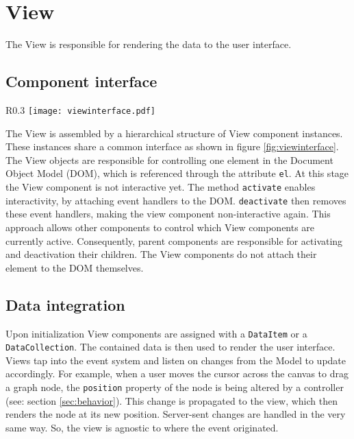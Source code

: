 \section{View}

The View is responsible for rendering the data to the user interface. 

\subsection{Component interface}

\begin{wrapfigure}{R}{0.3\textwidth}
\texttt{[image: viewinterface.pdf]}
\caption{Class diagram of the View component interface}
\label{fig:viewinterface}
\end{wrapfigure}

The View is assembled by a hierarchical structure of View component instances. These instances share a common interface as shown in figure \ref{fig:viewinterface}. The View objects are responsible for controlling one element in the Document Object Model (DOM), which is referenced through the attribute \texttt{el}. At this stage the View component is not interactive yet. The method \texttt{activate} enables interactivity, by attaching event handlers to the DOM. \texttt{deactivate} then removes these event handlers, making the view component non-interactive again. This approach allows other components to control which View components are currently active. Consequently, parent components are responsible for activating and deactivation their children. The View components do not attach their element to the DOM themselves.

\subsection{Data integration}

Upon initialization View components are assigned with a \texttt{DataItem} or a \texttt{DataCollection}. The contained data is then used to render the user interface. Views tap into the event system and listen on changes from the Model to update accordingly. For example, when a user moves the cursor across the canvas to drag a graph node, the \texttt{position} property of the node is being altered by a controller (see: section \ref{sec:behavior}). This change is propagated to the view, which then renders the node at its new position. Server-sent changes are handled in the very same way. So, the view is agnostic to where the event originated.

